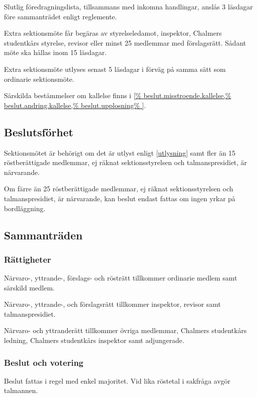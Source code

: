 \documentclass{styrdokument}
\begin{document}
\? Slutlig föredragningslista, tillsammans med inkomna handlingar, anslås 3 läsdagar före sammanträdet enligt reglemente.

\? Extra sektionsmöte får begäras av styrelseledamot, inspektor, Chalmers studentkårs styrelse, revisor eller minst 25 medlemmar med förslagsrätt.
Sådant möte ska hållas inom 15 läsdagar.
  
\? Extra sektionsmöte utlyses senast 5 läsdagar i förväg på samma sätt som ordinarie sektionsmöte.

\? Särskilda bestämmelser om kallelse finns i
\cref{%
  beslut.misstroende.kallelse,%
  beslut.andring.kallelse,%
  beslut.upplosning%
}.

\subsection{Beslutsförhet}

\? Sektionsmötet är behörigt om det är utlyst enligt \cref{utlysning} samt fler än 15 röstberättigade medlemmar, ej räknat sektionsstyrelsen och talmanspresidiet, är närvarande.

\? Om färre än 25 röstberättigade medlemmar, ej räknat sektionsstyrelsen och talmanspresidiet, är närvarande, kan beslut endast fattas om ingen yrkar på bordläggning.

\subsection{Sammanträden}

\subsubsection{Rättigheter}
\? Närvaro-, yttrande-, förslags- och rösträtt tillkommer ordinarie medlem samt särskild medlem.
\label{ratt.sektmote.rost}

\? Närvaro-, yttrande-, och förslagsrätt tillkommer inspektor, revisor samt talmanspresidiet.

\? Närvaro- och yttranderätt tillkommer övriga medlemmar, Chalmers studentkårs ledning, Chalmers studentkårs inspektor samt adjungerade.
\label{ratt.sektmote.grund}

\subsubsection{Beslut och votering}
\? Beslut fattas i regel med enkel majoritet.
Vid lika röstetal i sakfråga avgör talmannen.
\end{document}
